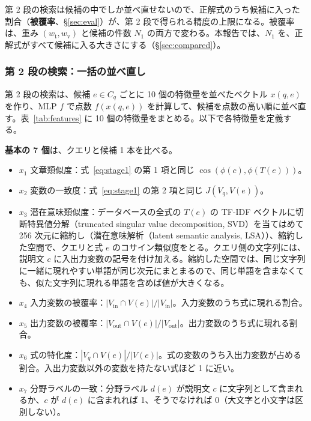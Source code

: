 \documentclass[11pt,a4paper]{ltjsarticle}
\newcommand{\Vin}{V_{\mathrm{in}}}
\newcommand{\Vout}{V_{\mathrm{out}}}
\begin{document}
第 2 段の検索は候補の中でしか並べ直せないので、正解式のうち候補に入った割合（\textbf{被覆率}、\S\ref{sec:eval}）が、第 2 段で得られる精度の上限になる。被覆率は、重み $(w_{\mathrm{t}}, w_{\mathrm{v}})$ と候補の件数 $N_1$ の両方で変わる。本報告では、$N_1$ を、正解式がすべて候補に入る大きさにする（\S\ref{sec:compared}）。

\subsubsection{第 2 段の検索：一括の並べ直し}\label{sec:stage2}
第 2 段の検索は、候補 $e \in C_q$ ごとに 10 個の特徴量を並べたベクトル $x(q, e)$ を作り、MLP $f$ で点数 $f(x(q, e))$ を計算して、候補を点数の高い順に並べ直す。表~\ref{tab:features} に 10 個の特徴量をまとめる。以下で各特徴量を定義する。

\textbf{基本の 7 個}は、クエリと候補 1 本を比べる。
\begin{itemize}[leftmargin=1.5em]
  \item $x_1$ 文章類似度：式~\eqref{eq:stage1} の第 1 項と同じ $\cos(\phi(c), \phi(T(e)))$。
  \item $x_2$ 変数の一致度：式~\eqref{eq:stage1} の第 2 項と同じ $J(V_q, V(e))$。
  \item $x_3$ 潜在意味類似度：データベースの全式の $T(e)$ の TF-IDF ベクトルに切断特異値分解（truncated singular value decomposition, SVD）を当てはめて 256 次元に縮約し（潜在意味解析（latent semantic analysis, LSA））、縮約した空間で、クエリと式 $e$ のコサイン類似度をとる。クエリ側の文字列には、説明文 $c$ に入出力変数の記号を付け加える。縮約した空間では、同じ文字列に一緒に現れやすい単語が同じ次元にまとまるので、同じ単語を含まなくても、似た文字列に現れる単語を含めば値が大きくなる。
  \item $x_4$ 入力変数の被覆率：$|\Vin \cap V(e)| / |\Vin|$。入力変数のうち式に現れる割合。
  \item $x_5$ 出力変数の被覆率：$|\Vout \cap V(e)| / |\Vout|$。出力変数のうち式に現れる割合。
  \item $x_6$ 式の特化度：$|V_q \cap V(e)| / |V(e)|$。式の変数のうち入出力変数が占める割合。入出力変数以外の変数を持たない式ほど 1 に近い。
  \item $x_7$ 分野ラベルの一致：分野ラベル $d(e)$ が説明文 $c$ に文字列として含まれるか、$c$ が $d(e)$ に含まれれば 1、そうでなければ 0（大文字と小文字は区別しない）。
\end{itemize}
\end{document}
